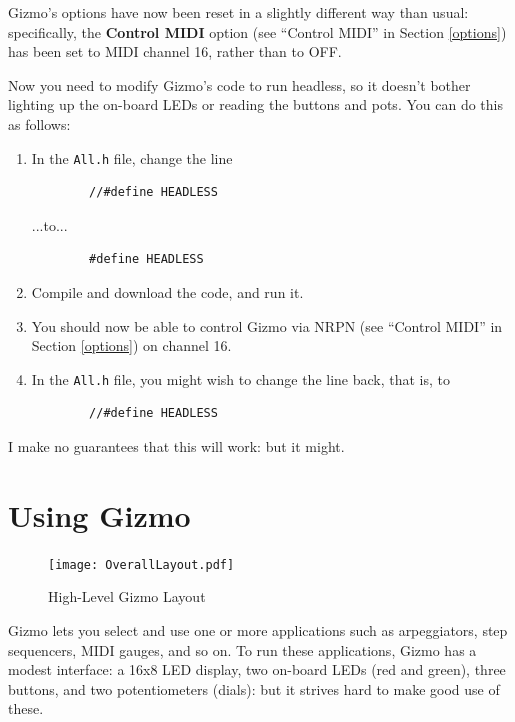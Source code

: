 \documentclass{article}
\begin{document}
Gizmo's options have now been reset in a slightly different way than usual: specifically, the {\bf Control MIDI} option (see ``Control MIDI'' in Section \ref{options}) has been set to MIDI channel 16, rather than to OFF.

Now you need to modify Gizmo's code to run headless, so it doesn't bother lighting up the on-board LEDs or reading the buttons and pots.   You can do this as follows:

\begin{enumerate}
\item In the \texttt{All.h} file, change the line 
\begin{verbatim}
        //#define HEADLESS
\end{verbatim}
...to...
\begin{verbatim}
        #define HEADLESS
\end{verbatim}
\item Compile and download the code, and run it.
\item You should now be able to control Gizmo via NRPN (see ``Control MIDI'' in Section \ref{options}) on channel 16.
\item In the \texttt{All.h} file, you might wish to change the line back, that is, to 
\begin{verbatim}
        //#define HEADLESS
\end{verbatim}

\end{enumerate}

I make no guarantees that this will work: but it might.

\clearpage

\section{Using Gizmo}

\begin{figure}
\vspace{-1.5em}\texttt{[image: OverallLayout.pdf]}
\vspace{-2.5em}\caption{\small High-Level Gizmo Layout}
\label{HighLevelGizmoLayout}
\vspace{-1em}
\end{figure}

Gizmo lets you select and use one or more applications such as arpeggiators, step sequencers, MIDI gauges, and so on.  To run these applications, Gizmo has a modest interface: a 16x8 LED display, two on-board LEDs (red and green), three buttons, and two potentiometers (dials): but it strives hard to make good use of these.  
\end{document}
